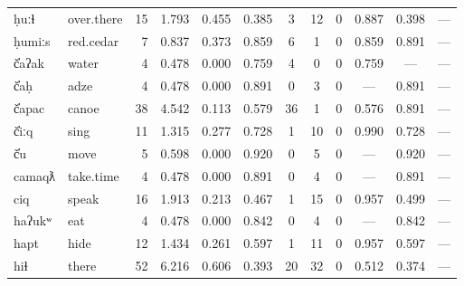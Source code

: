 \begin{landscape}
\begin{longtable}[c]{ l l | r r c c | c c c | c c c }
  ḥuːɬ               & over.there                & 15  & 1.793                     & 0.455           & 0.385      & 3         & 12          & 0            & 0.887     & 0.398       & —\\
  ḥumiːs             & red.cedar                 & 7   & 0.837                     & 0.373           & 0.859      & 6         & 1           & 0            & 0.859     & 0.891       & —\\
  č̓aʔak              & water                     & 4   & 0.478                     & 0.000           & 0.759      & 4         & 0           & 0            & 0.759     & —           & —\\
  č̓aḥ                & adze                      & 4   & 0.478                     & 0.000           & 0.891      & 0         & 3           & 0            & —         & 0.891       & —\\
  č̓apac              & canoe                     & 38  & 4.542                     & 0.113           & 0.579      & 36        & 1           & 0            & 0.576     & 0.891       & —\\
  č̓iːq               & sing                      & 11  & 1.315                     & 0.277           & 0.728      & 1         & 10          & 0            & 0.990     & 0.728       & —\\
  č̓u                 & move                      & 5   & 0.598                     & 0.000           & 0.920      & 0         & 5           & 0            & —         & 0.920       & —\\
  camaqƛ             & take.time                 & 4   & 0.478                     & 0.000           & 0.891      & 0         & 4           & 0            & —         & 0.891       & —\\
  ciq                & speak                     & 16  & 1.913                     & 0.213           & 0.467      & 1         & 15          & 0            & 0.957     & 0.499       & —\\
  haʔukʷ             & eat                       & 4   & 0.478                     & 0.000           & 0.842      & 0         & 4           & 0            & —         & 0.842       & —\\
  hapt               & hide                      & 12  & 1.434                     & 0.261           & 0.597      & 1         & 11          & 0            & 0.957     & 0.597       & —\\
  hiɬ                & there                     & 52  & 6.216                     & 0.606           & 0.393      & 20        & 32          & 0            & 0.512     & 0.374       & —\\

\end{longtable}
\end{landscape}
